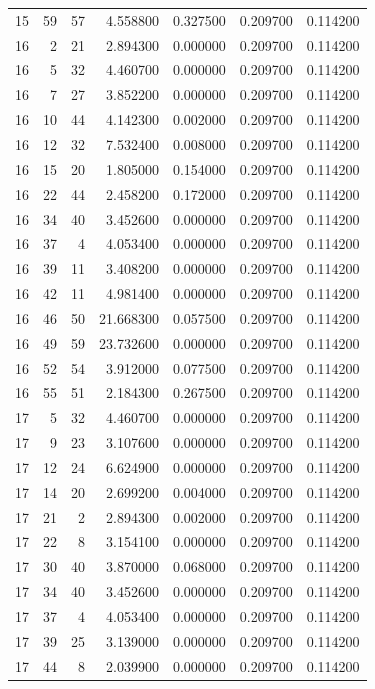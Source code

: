 \begin{table}
\begin{tabular}{rrrrrrr}
15 & 59 & 57 & 4.558800 & 0.327500 & 0.209700 & 0.114200 \\
16 & 2 & 21 & 2.894300 & 0.000000 & 0.209700 & 0.114200 \\
16 & 5 & 32 & 4.460700 & 0.000000 & 0.209700 & 0.114200 \\
16 & 7 & 27 & 3.852200 & 0.000000 & 0.209700 & 0.114200 \\
16 & 10 & 44 & 4.142300 & 0.002000 & 0.209700 & 0.114200 \\
16 & 12 & 32 & 7.532400 & 0.008000 & 0.209700 & 0.114200 \\
16 & 15 & 20 & 1.805000 & 0.154000 & 0.209700 & 0.114200 \\
16 & 22 & 44 & 2.458200 & 0.172000 & 0.209700 & 0.114200 \\
16 & 34 & 40 & 3.452600 & 0.000000 & 0.209700 & 0.114200 \\
16 & 37 & 4 & 4.053400 & 0.000000 & 0.209700 & 0.114200 \\
16 & 39 & 11 & 3.408200 & 0.000000 & 0.209700 & 0.114200 \\
16 & 42 & 11 & 4.981400 & 0.000000 & 0.209700 & 0.114200 \\
16 & 46 & 50 & 21.668300 & 0.057500 & 0.209700 & 0.114200 \\
16 & 49 & 59 & 23.732600 & 0.000000 & 0.209700 & 0.114200 \\
16 & 52 & 54 & 3.912000 & 0.077500 & 0.209700 & 0.114200 \\
16 & 55 & 51 & 2.184300 & 0.267500 & 0.209700 & 0.114200 \\
17 & 5 & 32 & 4.460700 & 0.000000 & 0.209700 & 0.114200 \\
17 & 9 & 23 & 3.107600 & 0.000000 & 0.209700 & 0.114200 \\
17 & 12 & 24 & 6.624900 & 0.000000 & 0.209700 & 0.114200 \\
17 & 14 & 20 & 2.699200 & 0.004000 & 0.209700 & 0.114200 \\
17 & 21 & 2 & 2.894300 & 0.002000 & 0.209700 & 0.114200 \\
17 & 22 & 8 & 3.154100 & 0.000000 & 0.209700 & 0.114200 \\
17 & 30 & 40 & 3.870000 & 0.068000 & 0.209700 & 0.114200 \\
17 & 34 & 40 & 3.452600 & 0.000000 & 0.209700 & 0.114200 \\
17 & 37 & 4 & 4.053400 & 0.000000 & 0.209700 & 0.114200 \\
17 & 39 & 25 & 3.139000 & 0.000000 & 0.209700 & 0.114200 \\
17 & 44 & 8 & 2.039900 & 0.000000 & 0.209700 & 0.114200 \\

\end{tabular}
\end{table}
